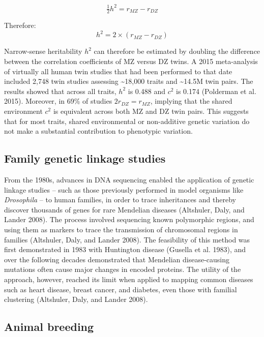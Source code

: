 \documentclass[
]{book}
\begin{document}
\begin{equation}
\tfrac{1}{2}h^2 = r_{MZ} - r_{DZ}
\end{equation}

Therefore:
\begin{equation}
h^2 = 2\times(r_{MZ} - r_{DZ})
\end{equation}

Narrow-sense heritability \(h^2\) can therefore be estimated by doubling the difference between the correlation coefficients of MZ versus DZ twins. A 2015 meta-analysis of virtually all human twin studies that had been performed to that date included 2,748 twin studies assessing \textasciitilde18,000 traits and \textasciitilde14.5M twin pairs. The results showed that across all traits, \(h^2\) is 0.488 and \(c^2\) is 0.174 (Polderman et al. 2015). Moreover, in 69\% of studies \(2r_{DZ} = r_{MZ}\), implying that the shared environment \(c^2\) is equivalent across both MZ and DZ twin pairs. This suggests that for most traits, shared environmental or non-additive genetic variation do not make a substantial contribution to phenotypic variation.

\hypertarget{family-genetic-linkage-studies}{%
\subsection{Family genetic linkage studies}\label{family-genetic-linkage-studies}}

From the 1980s, advances in DNA sequencing enabled the application of genetic linkage studies -- such as those previously performed in model organisms like \emph{Drosophila} -- to human families, in order to trace inheritances and thereby discover thousands of genes for rare Mendelian diseases (Altshuler, Daly, and Lander 2008). The process involved sequencing known polymorphic regions, and using them as markers to trace the transmission of chromosomal regions in families (Altshuler, Daly, and Lander 2008). The feasibility of this method was first demonstrated in 1983 with Huntington disease (Gusella et al. 1983), and over the following decades demonstrated that Mendelian disease-causing mutations often cause major changes in encoded proteins. The utility of the approach, however, reached its limit when applied to mapping common diseases such as heart disease, breast cancer, and diabetes, even those with familial clustering (Altshuler, Daly, and Lander 2008).

\hypertarget{animal-breeding}{%
\subsection{Animal breeding}\label{animal-breeding}}
\end{document}
